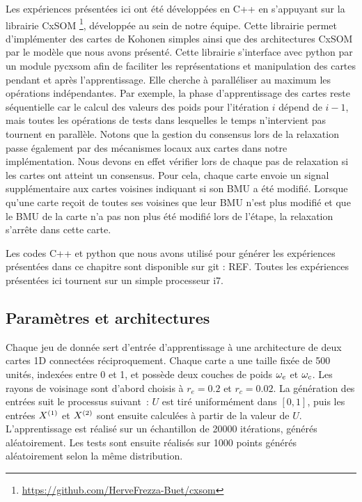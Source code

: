 \documentclass[../main]{subfiles}
\begin{document}
Les expériences présentées ici ont été développées en C++ en s'appuyant sur la librairie CxSOM \footnote{\url{https://github.com/HerveFrezza-Buet/cxsom}}, développée au sein de notre équipe.
Cette librairie permet d'implémenter des cartes de Kohonen simples ainsi que des architectures CxSOM par le modèle que nous avons présenté.
Cette librairie s'interface avec python par un module pycxsom afin de faciliter les représentations et manipulation des cartes pendant et après l'apprentissage. Elle cherche à paralléliser au maximum les opérations indépendantes. Par exemple, la phase d'apprentissage des cartes reste séquentielle car le calcul des valeurs des poids pour l'itération $i$ dépend de $i-1$, mais toutes les opérations de tests dans lesquelles le temps n'intervient pas tournent en parallèle.
Notons que la gestion du consensus lors de la relaxation passe également par des mécanismes locaux aux cartes dans notre implémentation. Nous devons en effet vérifier lors de chaque pas de relaxation si les cartes ont atteint un consensus. Pour cela, chaque carte envoie un signal supplémentaire aux cartes voisines indiquant si son BMU a été modifié. Lorsque qu'une carte reçoit de toutes ses voisines que leur BMU n'est plus modifié et que le BMU de la carte n'a pas non plus été modifié lors de l'étape, la relaxation s'arrête dans cette carte.

Les codes C++ et python que nous avons utilisé pour générer les expériences présentées dans ce chapitre sont disponible sur git : REF.
Toutes les expériences présentées ici tournent sur un simple processeur i7.

\subsection{Paramètres et architectures}

Chaque jeu de donnée sert d'entrée d'apprentissage à une architecture de deux cartes 1D connectées réciproquement. Chaque carte a une taille fixée de 500 unités, indexées entre 0 et 1, et possède deux couches de poids $\omega_e$ et $\omega_c$. Les rayons de voisinage sont d'abord choisis à $r_e = 0.2$ et $r_c = 0.02$.
La génération des entrées suit le processus suivant~: $U$ est tiré uniformément dans $[0,1]$, puis les entrées $X^{({1})}$ et $X^{({2})}$ sont ensuite calculées à partir de la valeur de $U$.
L'apprentissage est réalisé sur un échantillon de 20000 itérations, générés aléatoirement. Les tests sont ensuite réalisés sur 1000 points générés aléatoirement selon la même distribution.
\end{document}
